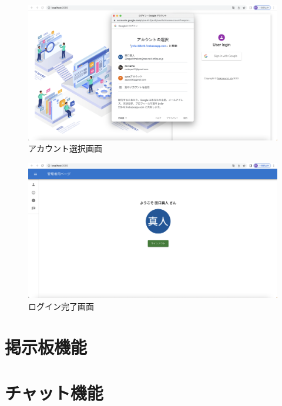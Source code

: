 \begin{figure}[!h]
  \begin{center}
    \includegraphics[scale=0.3, clip]{./img/sample14.png}
    \caption{アカウント選択画面}
    \label{fig:図の名前}
  \end{center}
  \end{figure}

  \begin{figure}[!h]
    \begin{center}
      \includegraphics[scale=0.3, clip]{./img/sample15.png}
      \caption{ログイン完了画面}
      \label{fig:図の名前}
    \end{center}
    \end{figure}

    \clearpage

\section{掲示板機能}

\section{チャット機能}
